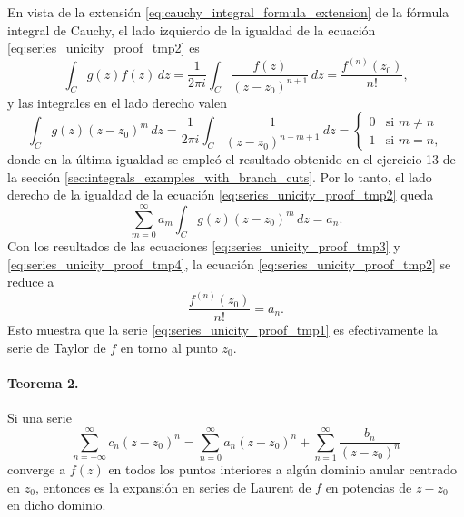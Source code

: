 \documentclass[a4paper]{report}
\begin{document}
En vista de la extensión \ref{eq:cauchy_integral_formula_extension} de la fórmula integral de Cauchy, el lado izquierdo de la igualdad de la ecuación \ref{eq:series_unicity_proof_tmp2} es
\begin{equation}\label{eq:series_unicity_proof_tmp3}
 \int_C g(z)f(z)\,dz=\frac{1}{2\pi i}\int_C \frac{f(z)}{(z-z_0)^{n+1}}\,dz=\frac{f^{(n)}(z_0)}{n!}, 
\end{equation}
y las integrales en el lado derecho valen
\begin{equation}\label{eq:series_unicity_proof_tmp5}
 \int_C g(z)(z-z_0)^m\,dz=\frac{1}{2\pi i}\int_C\frac{1}{(z-z_0)^{n-m+1}}\,dz=
 \left\{ 
 \begin{array}{ll}
  0 &\textrm{si }m\neq n\\
  1 &\textrm{si }m=n,
 \end{array}
 \right. 
\end{equation}
donde en la última igualdad se empleó el resultado obtenido en el ejercicio 13 de la sección \ref{sec:integrals_examples_with_branch_cuts}. Por lo tanto, el lado derecho de la igualdad de la ecuación \ref{eq:series_unicity_proof_tmp2} queda
\begin{equation}\label{eq:series_unicity_proof_tmp4}
 \sum_{m=0}^\infty a_m\int_C g(z)(z-z_0)^m\,dz=a_n. 
\end{equation}
Con los resultados de las ecuaciones \ref{eq:series_unicity_proof_tmp3} y \ref{eq:series_unicity_proof_tmp4}, la ecuación \ref{eq:series_unicity_proof_tmp2} se reduce a
\[
 \frac{f^{(n)}(z_0)}{n!}=a_n.
\]
Esto muestra que la serie \ref{eq:series_unicity_proof_tmp1} es efectivamente la serie de Taylor de \(f\) en torno al punto \(z_0\).

\paragraph{Teorema 2.} Si una serie 
\begin{equation}\label{eq:power_series_generic_definition_tmp6}
 \sum_{n=-\infty}^\infty c_n(z-z_0)^n=\sum_{n=0}^\infty a_n(z-z_0)^n+\sum_{n=1}^\infty\frac{b_n}{(z-z_0)^n} 
\end{equation} 
converge a \(f(z)\) en todos los puntos interiores a algún dominio anular centrado en \(z_0\), entonces es la expansión en series de Laurent de \(f\) en potencias de \(z-z_0\) en dicho dominio.
 
\end{document}
